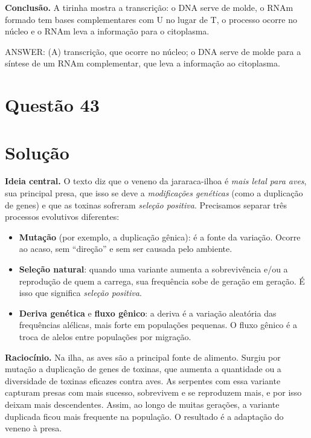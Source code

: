 \documentclass{article}%
\begin{document}
\textbf{Conclusão.} A tirinha mostra a transcrição: o DNA serve de molde, o RNAm formado tem bases complementares com U no lugar de T, o processo ocorre no núcleo e o RNAm leva a informação para o citoplasma.

ANSWER: (A) transcrição, que ocorre no núcleo; o DNA serve de molde para a síntese de um RNAm complementar, que leva a informação ao citoplasma.%
\newpage%
\section*{Questão 43}

\section*{Solução}

\textbf{Ideia central.} O texto diz que o veneno da jararaca-ilhoa é \emph{mais letal para aves}, sua principal presa, que isso se deve a \emph{modificações genéticas} (como a duplicação de genes) e que as toxinas sofreram \emph{seleção positiva}. Precisamos separar três processos evolutivos diferentes:
\begin{itemize}
  \item \textbf{Mutação} (por exemplo, a duplicação gênica): é a fonte da variação. Ocorre ao acaso, sem ``direção'' e sem ser causada pelo ambiente.
  \item \textbf{Seleção natural}: quando uma variante aumenta a sobrevivência e/ou a reprodução de quem a carrega, sua frequência sobe de geração em geração. É isso que significa \emph{seleção positiva}.
  \item \textbf{Deriva genética} e \textbf{fluxo gênico}: a deriva é a variação aleatória das frequências alélicas, mais forte em populações pequenas. O fluxo gênico é a troca de alelos entre populações por migração.
\end{itemize}

\textbf{Raciocínio.} Na ilha, as aves são a principal fonte de alimento. Surgiu por mutação a duplicação de genes de toxinas, que aumenta a quantidade ou a diversidade de toxinas eficazes contra aves. As serpentes com essa variante capturam presas com mais sucesso, sobrevivem e se reproduzem mais, e por isso deixam mais descendentes. Assim, ao longo de muitas gerações, a variante duplicada ficou mais frequente na população. O resultado é a adaptação do veneno à presa.
\end{document}
